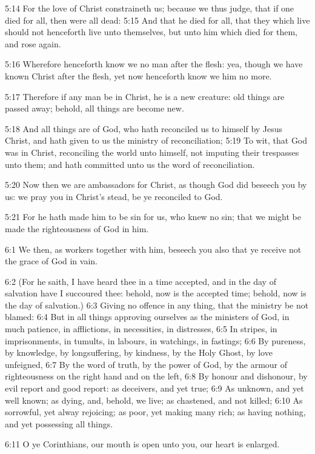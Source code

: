 5:14 For the love of Christ constraineth us; because we thus judge,
that if one died for all, then were all dead: 5:15 And that he died
for all, that they which live should not henceforth live unto
themselves, but unto him which died for them, and rose again.

5:16 Wherefore henceforth know we no man after the flesh: yea, though
we have known Christ after the flesh, yet now henceforth know we him
no more.

5:17 Therefore if any man be in Christ, he is a new creature: old
things are passed away; behold, all things are become new.

5:18 And all things are of God, who hath reconciled us to himself by
Jesus Christ, and hath given to us the ministry of reconciliation;
5:19 To wit, that God was in Christ, reconciling the world unto
himself, not imputing their trespasses unto them; and hath committed
unto us the word of reconciliation.

5:20 Now then we are ambassadors for Christ, as though God did beseech
you by us: we pray you in Christ's stead, be ye reconciled to God.

5:21 For he hath made him to be sin for us, who knew no sin; that we
might be made the righteousness of God in him.

6:1 We then, as workers together with him, beseech you also that ye
receive not the grace of God in vain.

6:2 (For he saith, I have heard thee in a time accepted, and in the
day of salvation have I succoured thee: behold, now is the accepted
time; behold, now is the day of salvation.)  6:3 Giving no offence in
any thing, that the ministry be not blamed: 6:4 But in all things
approving ourselves as the ministers of God, in much patience, in
afflictions, in necessities, in distresses, 6:5 In stripes, in
imprisonments, in tumults, in labours, in watchings, in fastings; 6:6
By pureness, by knowledge, by longsuffering, by kindness, by the Holy
Ghost, by love unfeigned, 6:7 By the word of truth, by the power of
God, by the armour of righteousness on the right hand and on the left,
6:8 By honour and dishonour, by evil report and good report: as
deceivers, and yet true; 6:9 As unknown, and yet well known; as dying,
and, behold, we live; as chastened, and not killed; 6:10 As sorrowful,
yet alway rejoicing; as poor, yet making many rich; as having nothing,
and yet possessing all things.

6:11 O ye Corinthians, our mouth is open unto you, our heart is
enlarged.

